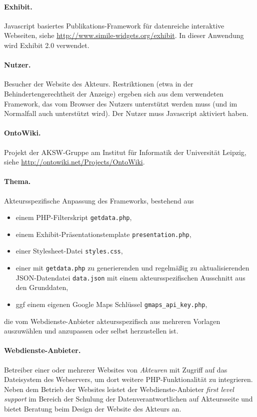 \documentclass[11pt,a4paper]{article}
\begin{document}
\paragraph{Exhibit.} 
Javascript basiertes Publikations-Framework für datenreiche interaktive
Webseiten, siehe \url{http://www.simile-widgets.org/exhibit}.  In dieser
Anwendung wird Exhibit 2.0 verwendet.

\paragraph{Nutzer.} 
Besucher der Website des Akteurs. Restriktionen (etwa in der
Behindertengerechtheit der Anzeige) ergeben sich aus dem verwendeten
Framework, das vom Browser des Nutzers unterstützt werden muss (und im
Normalfall auch unterstützt wird). Der Nutzer muss Javascript aktiviert haben.

\paragraph{OntoWiki.} 
Projekt der AKSW-Gruppe am Institut für Informatik der Universität Leipzig,
siehe \url{http://ontowiki.net/Projects/OntoWiki}.

\paragraph{Thema.} 
Akteursspezifische Anpassung des Frameworks, bestehend aus 
\begin{itemize}
\item einem PHP-Filterskript \texttt{getdata.php},
\item einem Exhibit-Präsentationstemplate \texttt{presentation.php},
\item einer Stylesheet-Datei \texttt{styles.css},
\item einer mit \texttt{getdata.php} zu generierenden und regelmäßig zu
  aktualisierenden JSON-Datendatei \texttt{data.json} mit einem
  akteursspezifischen Ausschnitt aus den Grunddaten,
\item ggf einem eigenen Google Maps Schlüssel \texttt{gmaps\_api\_key.php},
\end{itemize}
die vom Webdienste-Anbieter akteursspezifisch aus mehreren Vorlagen
auszuwählen und anzupassen oder selbst herzustellen ist.

\paragraph{Webdienste-Anbieter.} 
Betreiber einer oder mehrerer Websites von \emph{Akteuren} mit Zugriff auf das
Dateisystem des Webservers, um dort weitere PHP-Funktionalität zu integrieren.
Neben dem Betrieb der Websites leistet der Webdienste-Anbieter \emph{first
  level support} im Bereich der Schulung der Datenverantwortlichen auf
Akteursseite und bietet Beratung beim Design der Website des Akteurs an.
\end{document}

